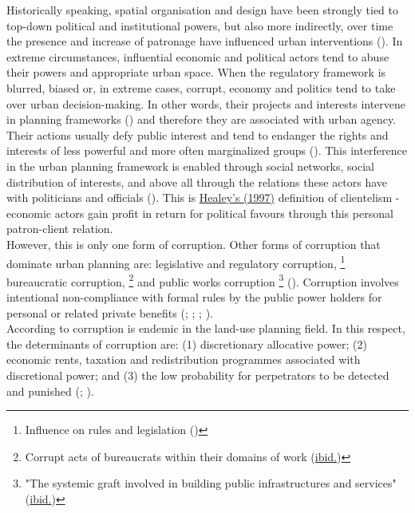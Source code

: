 \documentclass[11pt]{report}
\begin{document}
{{{Historically speaking, spatial organisation and design have been strongly tied to top-down political and institutional powers, but also more indirectly, over time the presence and increase of patronage have influenced urban interventions
(\href{Van}{\citealt{van_power_2013}}).
In extreme circumstances, influential economic and political actors tend to abuse their powers and appropriate urban space.
When the regulatory framework is blurred, biased or, in extreme cases, corrupt, economy and politics tend to take over urban decision-making.
In other words, their projects and interests intervene in planning frameworks
(\href{Hudson}{\citealt{hudson_political_2014}}) and therefore they are associated with urban agency.
\\

Their actions usually defy public interest and tend to endanger the rights and interests of less powerful and more often marginalized groups (\href{Sager}{\citealt{sager_logic_2006}}).
This interference in the urban planning framework is enabled through social networks, social distribution of interests, and above all through the relations these actors have with politicians and officials
(\href{Healey}{\citealt{healey_collaborative_1997}}).
This is \href{Healey}{Healey's (1997)} definition of clientelism - economic actors gain profit in return for political favours through this personal patron-client relation.
\\

However, this is only one form of corruption.
Other forms of corruption that dominate urban planning are:
legislative and regulatory corruption,
\footnote{Influence on rules and legislation (\href{Chiodelli}{\citealt{chiodelli_corruption_2015}})}
bureaucratic corruption,
\footnote{Corrupt acts of bureaucrats within their domains of work (\href{Chiodelli}{ibid.})}
and
public works corruption
\footnote{"The systemic graft involved in building public infrastructures and services" (\href{Chiodelli}{ibid.})}
(\href{Chiodelli}{\citealt{chiodelli_corruption_2015}}).
Corruption involves intentional  non-compliance  with  formal  rules by the public power holders for personal or related private benefits
(\href{Kaufmann}{\citealt{kaufmann_XXX_1997}};
\href{Begovic}{\citealt{begovic_corruption_2001}}; \href{Grubovic}{\citealt{grubovic_belgrade_2006}};
\href{Chiodelli}{\citealt{chiodelli_corruption_2015}}).
\\

According to
\href{Chiodelli}{\cite{chiodelli_corruption_2015}} corruption is endemic in the land-use planning field.
In this respect, the determinants of corruption are:
(1) discretionary allocative power; (2) economic rents, taxation and redistribution programmes associated with discretional power; and (3) the low probability for perpetrators to be detected and punished
(\href{Healey}{\citealt{healey_collaborative_1997}}; 
\href{Chiodelli}{\citealt{chiodelli_corruption_2015}}).
\\

}}}
\end{document}
